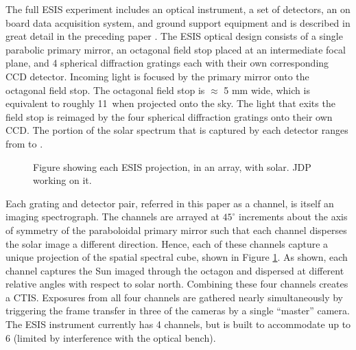     	The full ESIS experiment includes an optical instrument, a set of detectors, an on board data acquisition system, and ground support equipment and is described in great detail in the preceding paper \citep{ESIS}.
    	The ESIS optical design consists of a single parabolic primary mirror, an octagonal field stop placed at an intermediate focal plane, and 4 spherical diffraction gratings each with their own corresponding CCD detector.
    	Incoming light is focused by the primary mirror onto the octagonal field stop. 
    	The octagonal field stop is $\approx$ 5 mm wide, which is equivalent to roughly 11\arcmin \  when projected onto the sky. 
    	The light that exits the field stop is reimaged  by the four spherical diffraction gratings onto their own CCD.
    	The portion of the solar spectrum that is captured by each detector ranges from \hei to \ov.
    	
    	
        \begin{figure}[ht]
			\begin{center}
				\caption{Figure showing each ESIS projection, in an array, with solar.  JDP working on it.}
				\label{fig:level_1_array}
			\end{center}
		\end{figure}

    	
    	
    	Each grating and detector pair, referred in this paper as a channel, is itself an imaging spectrograph.  
    	The channels are arrayed at $45^{\circ}$ increments about the axis of symmetry of the paraboloidal primary mirror such that each channel disperses the solar image a different direction. 
    	Hence, each of these channels capture a unique projection of the spatial spectral cube, shown in Figure \ref{fig:level_1_array}. 
    	As shown, each channel captures the Sun imaged through the octagon and dispersed at different relative angles with respect to solar north. Combining these four channels creates a CTIS. Exposures from all four channels are gathered nearly simultaneously by triggering the frame transfer in three of the cameras by a single ``master'' camera. 
    	The ESIS instrument currently has 4 channels, but is built to accommodate up to 6 (limited by interference with the optical bench).

